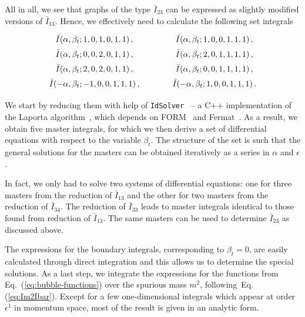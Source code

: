 \documentclass[a4paper,11pt]{article}
\numberwithin{equation}{section}
\begin{document}
All in all, we see that graphs of the type $\bar I_{23}$ can be expressed as
slightly modified versions of $\bar I_{13}$.
%
Hence, we effectively need to calculate the following set integrals
%
\begin{align}
  {\renewcommand{\arraystretch}{1.5}%
    \begin{array}{c@{\qquad \qquad}c}
      \bar I(\alpha, \beta_t; 1, 0, 1, 0, 1, 1)\,,  &
      \bar I(\alpha, \beta_t; 1, 0, 0, 1, 1, 1)\,, 
      \\
      \bar I(\alpha, \beta_t; 0, 0, 2, 0, 1, 1)\,, &
      \bar I(\alpha, \beta_t; 2, 0, 1, 1, 1, 1)\,,
      \\
      \bar I(\alpha, \beta_t; 2, 0, 2, 0, 1, 1)\,, &
      \bar I(\alpha, \beta_t; 0, 0, 1, 1, 1, 1)\,,  
      \\
      \bar I(-\alpha, \beta_t; -1, 0, 0, 1, 1, 1)\,, &
      \bar I(-\alpha, \beta_t; 1, 0, 0, 1, 1, 1)\,.
    \end{array}
  }
  \label{eq:bubble-functions}
\end{align}
%

We start by reducing them with help of {\tt IdSolver}~\cite{Czakon:idsolver} --
a C++ implementation of the Laporta algorithm~\cite{Laporta:2001dd}, which
depends on { FORM}~\cite{Ruijl:2017dtg} and {Fermat}~\cite{fermat}. 
%
As a result, we obtain five master integrals, for which we then derive a set of
differential equations with respect to the variable $\beta_t$. 
%
The structure of
the set is such that the general solutions for the masters can be obtained
iteratively as a series in $\alpha$ and $\epsilon$. 

In fact, we only had to solve two systems of differential equations:
one for three masters from the reduction of $\bar I_{13}$ and the other for two
masters from the reduction of $\bar I_{34}$. The reduction of $\bar I_{33}$ leads to
master integrals identical to those found from reduction of $\bar I_{13}$.
The same masters can be used to determine $\bar I_{23}$ as discussed above.

%
The expressions for the boundary integrals, corresponding to $\beta_t = 0$, are easily
calculated through direct integration and this allows us to determine the
special solutions.
%
As a last step, we integrate the expressions for the functions from
Eq.~(\ref{eq:bubble-functions}) over the spurious mass $m^2$,
following~Eq.(\ref{eq:Im2Ibar}).  Except for a few one-dimensional integrals
which appear at order $\epsilon^1$ in momentum space, most of the result is
given in an analytic form.
\end{document}
